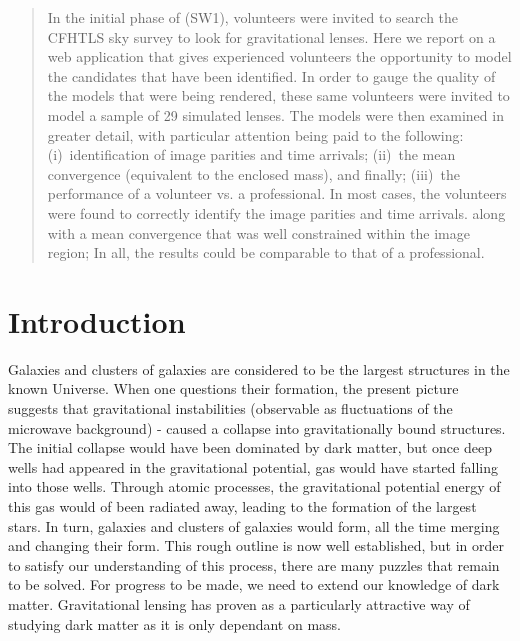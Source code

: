 \begin{abstract}
In the initial phase of \sw (SW1), volunteers were invited to search the CFHTLS sky survey to look for gravitational lenses.
Here we report on a web application that gives experienced volunteers the opportunity to model the candidates that have been identified.
In order to gauge the quality of the models that were being rendered, these same volunteers were invited to model a sample of 29 simulated lenses.
The models were then examined in greater detail, with particular attention being paid to the following:
(i)~identification of image parities and time arrivals;
(ii)~the mean convergence (equivalent to the enclosed mass), and finally;
(iii)~the performance of a volunteer vs. a professional.
In most cases, the volunteers were found to correctly identify the image parities and time arrivals.
 along with a mean convergence that was well constrained within the image region;
In all, the results could be comparable to that of a professional.
\end{abstract}

\begin{keywords}
\end{keywords}

\section{Introduction}


Galaxies and clusters of galaxies are considered to be the largest structures in the known Universe. When one questions their formation,  the present picture suggests that gravitational instabilities  (observable as fluctuations of the microwave background) %
 - caused a collapse into gravitationally bound structures. %
The initial collapse would have been dominated by dark matter, but once deep wells had appeared in the gravitational potential, gas would have started falling into those wells. 
Through atomic processes,
 the gravitational potential energy of this gas would of been radiated away, leading to the formation of the largest stars. 
In turn, galaxies and clusters of galaxies would form, all the time merging and changing their form.
This rough outline is now well established, but in order to satisfy our understanding of this process, there are many puzzles  that remain to be solved. For progress to be made, we need to extend our knowledge of dark matter. Gravitational lensing has proven as a particularly attractive way of studying dark matter as it is only dependant on mass.



